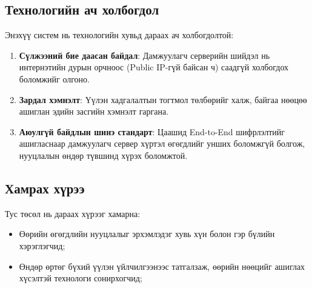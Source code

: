     \subsection*{Технологийн ач холбогдол}
         Энэхүү систем нь технологийн хувьд дараах ач холбогдолтой:
         \begin{enumerate}[itemsep=0mm]
            \item \textbf{Сүлжээний бие даасан байдал}: Дамжуулагч серверийн шийдэл нь интернэтийн дурын орчноос (Public IP-гүй байсан ч) саадгүй холбогдох боломжийг олгоно.
            \item \textbf{Зардал хэмнэлт}: Үүлэн хадгалалтын тогтмол төлбөрийг халж, байгаа нөөцөө ашиглан эдийн засгийн хэмнэлт гаргана.
            \item \textbf{Аюулгүй байдлын шинэ стандарт}: Цаашид End-to-End шифрлэлтийг ашигласнаар дамжуулагч сервер хүртэл өгөгдлийг унших боломжгүй болгож, нууцлалын өндөр түвшинд хүрэх боломжтой.
        \end{enumerate}

    \subsection*{Хамрах хүрээ}
    Тус төсөл нь дараах хүрээг хамарна:
    \begin{itemize}[nosep]
        \item Өөрийн өгөгдлийн нууцлалыг эрхэмлэдэг хувь хүн болон гэр бүлийн хэрэглэгчид;
        \item Өндөр өртөг бүхий үүлэн үйлчилгээнээс татгалзаж, өөрийн нөөцийг ашиглах хүсэлтэй технологи сонирхогчид;
    \end{itemize}

